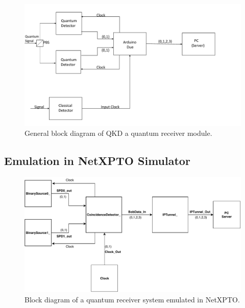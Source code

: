 \begin{refsection}
	\begin{figure}[H]
		\centering
		\includegraphics[width=1\linewidth]{./sdf/arduino_quantum_rx/figures/DiagramaGeral.pdf}
		\caption{General block diagram of QKD a quantum receiver module.}
		\label{fig:arduino}
	\end{figure}


		
	\subsection{Emulation in NetXPTO Simulator}
	
	\vspace{11pt}
	
	\begin{figure}[H]
		\centering
		\includegraphics[width=0.9\linewidth]{./sdf/arduino_quantum_rx/figures/NetXPTO_implementation.pdf}
		\caption{Block diagram of a quantum receiver system emulated in NetXPTO.}
		\label{fig:netxpto}
	\end{figure}
	

\end{refsection}
